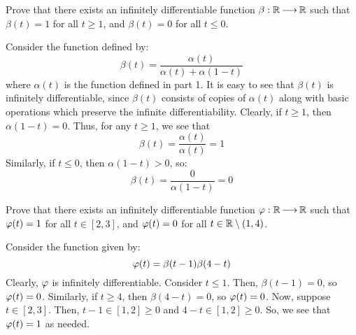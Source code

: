 \begin{qu}[num=4.2]
    Prove that there exists an infinitely differentiable function
    $ \beta: \mathbb{R} \operatorname{\longrightarrow} \mathbb{R} $ such that $ \beta(t) = 1 $ for all
    $ t \geq 1 $, and $ \beta(t) = 0 $ for all $ t \leq 0 $.
\end{qu}

\begin{soln}
    Consider the function defined by:
    \begin{equation*}
        \beta(t) = \frac{\alpha(t)}{\alpha(t) + \alpha(1-t)}
    \end{equation*}
    where $ \alpha(t) $ is the function defined in part 1. \vsp
    It is easy to see that $ \beta(t) $ is infinitely differentiable,
    since $ \beta(t) $ consists of copies of $ \alpha(t) $ along with basic
    operations which preserve the infinite differentiability. \vsp
    Clearly, if $ t \geq 1 $, then $ \alpha(1 - t) = 0 $. Thus, for any
    $ t \geq 1 $, we see that
    \begin{equation*}
        \beta(t) = \frac{\alpha(t)}{\alpha(t)} = 1
    \end{equation*}
    Similarly, if $ t \leq 0 $, then $ \alpha(1 - t) > 0 $, so:
    \begin{equation*}
        \beta(t) = \frac{0}{\alpha(1 - t)} = 0
    \end{equation*}
\end{soln}

\newpage
\begin{qu}[num=4.3]
    Prove that there exists an infinitely differentiable function
    $ \operatorname{\varphi}: \mathbb{R} \operatorname{\longrightarrow} \mathbb{R} $ such that $ \operatorname{\varphi}(t) = 1 $ for all
    $ t \in [2, 3] $, and $ \operatorname{\varphi}(t) = 0 $ for all $ t \in \mathbb{R} \setminus
    (1, 4) $.
\end{qu}

\begin{soln}
    Consider the function given by:
    \begin{equation*}
        \operatorname{\varphi}(t) = \beta(t - 1)\beta(4 - t)
    \end{equation*}
    Clearly, $ \operatorname{\varphi} $ is infinitely differentiable. \vsp
    Consider $ t \leq 1 $. Then, $ \beta(t - 1) = 0 $, so $ \operatorname{\varphi}(t) = 0 $.
    Similarly, if $ t \geq 4 $, then $ \beta(4 - t) = 0 $, so $ \operatorname{\varphi}(t) = 0 $.
    \vsp
    Now, suppose $ t \in [2, 3] $.
    Then, $ t - 1 \in [1, 2] \geq 0 $ and $ 4 - t \in [1, 2] \geq 0 $.
    So, we see that $ \operatorname{\varphi}(t) = 1 $ as needed.
\end{soln}


